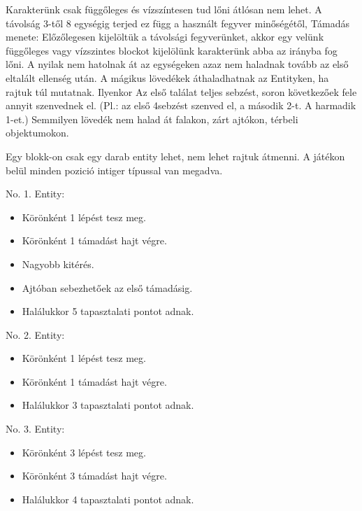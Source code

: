 Karakterünk csak függőleges és vízszíntesen tud lőni átlósan nem lehet. A távolság 3-től 8 egységig terjed ez függ a használt fegyver minőségétől, %
\newline
Támadás menete:
\newline
Előzőlegesen kijelöltük a távolsági fegyverünket, akkor egy velünk függőleges vagy vízszintes blockot kijelölünk karakterünk abba az irányba fog lőni.
A nyilak nem hatolnak át az egységeken azaz nem haladnak tovább az első eltalált ellenség után.
A mágikus lövedékek áthaladhatnak az Entityken, ha rajtuk túl mutatnak. Ilyenkor Az első találat teljes sebzést, soron következőek fele annyit szenvednek el. (Pl.: az első 4sebzést szenved el, a második 2-t. A harmadik 1-et.)
Semmilyen lövedék nem halad át falakon, zárt ajtókon, térbeli objektumokon.



\newpage
{}

Egy blokk-on csak egy darab entity lehet, nem lehet rajtuk átmenni.
A játékon belül minden pozició intiger típussal van megadva.



\noindent No. 1. Entity:
\begin{itemize}
    \item Körönként 1 lépést tesz meg.
    \item Körönként 1 támadást hajt végre.
    \item Nagyobb kitérés.
    \item Ajtóban sebezhetőek az első támadásig.
    \item Halálukkor 5 tapasztalati pontot adnak.
\end{itemize}

\noindent No. 2. Entity:
\begin{itemize}
    \item Körönként 1 lépést tesz meg.
    \item Körönként 1 támadást hajt végre.
    \item Halálukkor 3 tapasztalati pontot adnak.
\end{itemize}

\noindent No. 3. Entity:
\begin{itemize}
    \item Körönként 3 lépést tesz meg.
    \item Körönként 3 támadást hajt végre.
    \item Halálukkor 4 tapasztalati pontot adnak.
\end{itemize}

